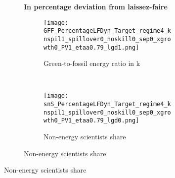 \begin{figure}[h!!!]
	\centering 	\caption{Efficient and optimal allocation: no knowledge spillovers}\label{fig:optAll_percLf_dyn_noKN_add}
	\begin{subfigure}[]{1\textwidth}	
		\centering\footnotesize{\textbf{In percentage deviation from laissez-faire}}\\ \vspace{2mm}
		\begin{subfigure}[]{0.4\textwidth}
			\caption{Green-to-fossil energy ratio in k }
			\texttt{[image: GFF\_PercentageLFDyn\_Target\_regime4\_knspil1\_spillover0\_noskill0\_sep0\_xgrowth0\_PV1\_etaa0.79\_lgd1.png]}
		\end{subfigure}
		\begin{minipage}[]{0.1\textwidth}
			\ 
		\end{minipage}
		\begin{subfigure}[]{0.4\textwidth}
			\caption{Non-energy scientists share }
			\texttt{[image: snS\_PercentageLFDyn\_Target\_regime4\_knspil1\_spillover0\_noskill0\_sep0\_xgrowth0\_PV1\_etaa0.79\_lgd0.png]}
		\end{subfigure}
	\end{subfigure}
\end{figure}

